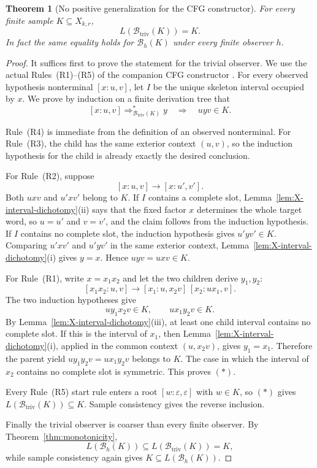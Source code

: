 \documentclass[11pt]{article}
\newtheorem{theorem}{Theorem}[section]
\theoremstyle{definition}
\theoremstyle{remark}
\newcommand{\eps}{\varepsilon}
\begin{document}
\begin{theorem}[No positive generalization for the CFG constructor]
\label{thm:X-cfg-no-generalization}
For every finite sample \(K\subseteq X_{k,r}\),
\[
 L(\mathcal B_{\mathrm{triv}}(K))=K.
\]
In fact the same equality holds for \(\mathcal B_h(K)\) under every finite
observer \(h\).
\end{theorem}

\begin{proof}
It suffices first to prove the statement for the trivial observer.  We use the
actual Rules~(R1)--(R5) of the companion CFG constructor
\cite{KuriyamaCFG}.  For every observed hypothesis nonterminal
\([x:u,v]\), let \(I\) be the unique skeleton interval occupied by \(x\).
We prove by induction on a finite derivation tree that
\[
 [x:u,v]\Rightarrow_{\mathcal B_{\mathrm{triv}}(K)}^* y
 \quad\Longrightarrow\quad
 uyv\in K.
\tag{*}
\]

Rule~(R4) is immediate from the definition of an observed nonterminal.
For Rule~(R3), the child has the same exterior context \((u,v)\), so the
induction hypothesis for the child is already exactly the desired conclusion.

For Rule~(R2), suppose
\[
 [x:u,v]\to[x:u',v'].
\]
Both \(uxv\) and \(u'xv'\) belong to \(K\).  If \(I\) contains a complete
slot, Lemma~\ref{lem:X-interval-dichotomy}(ii) says that the fixed factor
\(x\) determines the whole target word, so \(u=u'\) and \(v=v'\), and the
claim follows from the induction hypothesis.  If \(I\) contains no complete
slot, the induction hypothesis gives \(u'yv'\in K\).  Comparing
\(u'xv'\) and \(u'yv'\) in the same exterior context,
Lemma~\ref{lem:X-interval-dichotomy}(i) gives \(y=x\).  Hence
\(uyv=uxv\in K\).

For Rule~(R1), write \(x=x_1x_2\) and let the two children derive
\(y_1,y_2\):
\[
 [x_1x_2:u,v]
 \to
 [x_1:u,x_2v]\,[x_2:ux_1,v].
\]
The two induction hypotheses give
\[
 uy_1x_2v\in K,
 \qquad
 ux_1y_2v\in K.
\]
By Lemma~\ref{lem:X-interval-dichotomy}(iii), at least one child interval
contains no complete slot.  If this is the interval of \(x_1\), then
Lemma~\ref{lem:X-interval-dichotomy}(i), applied in the common context
\((u,x_2v)\), gives \(y_1=x_1\).  Therefore the parent yield
\(uy_1y_2v=ux_1y_2v\) belongs to \(K\).  The case in which the interval of
\(x_2\) contains no complete slot is symmetric.  This proves \((*)\).

Every Rule~(R5) start rule enters a root \([w:\eps,\eps]\) with \(w\in K\),
so \((*)\) gives
\(L(\mathcal B_{\mathrm{triv}}(K))\subseteq K\).  Sample consistency gives the
reverse inclusion.

Finally the trivial observer is coarser than every finite observer.  By
Theorem~\ref{thm:monotonicity},
\[
 L(\mathcal B_h(K))
 \subseteq
 L(\mathcal B_{\mathrm{triv}}(K))
 =K,
\]
while sample consistency again gives \(K\subseteq L(\mathcal B_h(K))\).
\end{proof}
\end{document}
